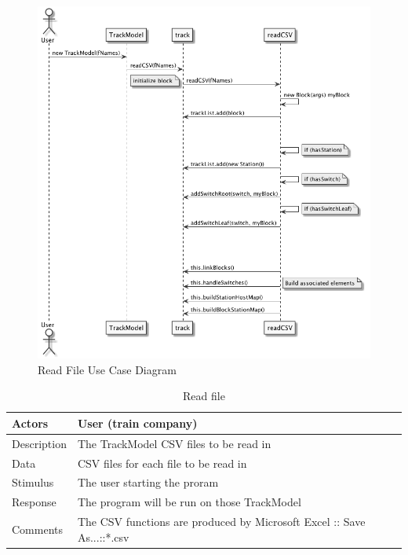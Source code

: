 \documentclass[]{article}
\begin{document}
\begin{figure}[H]
	\centering
	\includegraphics[scale=.5]{readFile.png}
	\caption{Read File Use Case Diagram}
\end{figure}

\begin{table}[H]
	\centering
	\caption{Read file}
	\begin{tabular}{|l|l|}
		\hline
		Actors & \parbox[t]{10cm}{User (train company)} \\ \hline
		Description & \parbox[t]{10cm}{The TrackModel CSV files to be read in} \\ \hline
		Data &  \parbox[t]{10cm}{CSV files for each file to be read in} \\ \hline
		Stimulus &  \parbox[t]{10cm}{The user starting the proram} \\ \hline
		Response & \parbox[t]{10cm}{The program will be run on those TrackModel}\\ \hline
		Comments & \parbox[t]{10cm}{The CSV functions are produced by Microsoft Excel :: Save As...::*.csv}  \\ \hline
	\end{tabular}
\end{table}
\end{document}
